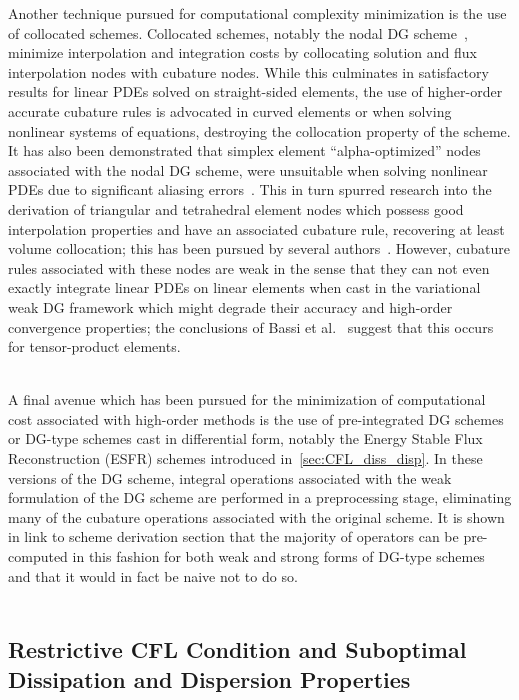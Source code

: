 \documentclass[12pt,Bold,letterpaper,TexShade]{mcgilletdclass}
\numberwithin{equation}{section}
\begin{document}
Another technique pursued for computational complexity minimization is the use of collocated schemes. Collocated schemes, notably the nodal DG scheme~\cite{hesthaven2002,hesthaven2007}, minimize interpolation and integration costs by collocating solution and flux interpolation nodes with cubature nodes. While this culminates in satisfactory results for linear PDEs solved on straight-sided elements, the use of higher-order accurate cubature rules is advocated in curved elements or when solving nonlinear systems of equations, destroying the collocation property of the scheme. It has also been demonstrated that simplex element ``alpha-optimized'' nodes~\cite{warburton2006} associated with the nodal DG scheme, were unsuitable when solving nonlinear PDEs due to significant aliasing errors~\cite{witherden2014}. This in turn spurred research into the derivation of triangular and tetrahedral element nodes which possess good interpolation properties and have an associated cubature rule, recovering at least volume collocation; this has been pursued by several authors~\cite{witherden2014,williams2014b,shunn2012}. However, cubature rules associated with these nodes are weak in the sense that they can not even exactly integrate linear PDEs on linear elements when cast in the variational weak DG framework which might degrade their accuracy and high-order convergence properties; the conclusions of Bassi et al.~\cite{bassi2013} suggest that this occurs for tensor-product elements.
\\~

A final avenue which has been pursued for the minimization of computational cost associated with high-order methods is the use of pre-integrated DG schemes~\cite{atkins1996} or DG-type schemes cast in differential form, notably the Energy Stable Flux Reconstruction (ESFR) schemes introduced in~\autoref{sec:CFL_diss_disp}. In these versions of the DG scheme, integral operations associated with the weak formulation of the DG scheme are performed in a preprocessing stage, eliminating many of the cubature operations associated with the original scheme. It is shown in {\color{red} link to scheme derivation section} that the majority of operators can be pre-computed in this fashion for both weak and strong forms of DG-type schemes and that it would in fact be naive not to do so.
\\~

\subsection{Restrictive CFL Condition and Suboptimal Dissipation and Dispersion Properties}
\label{sec:CFL_diss_disp}
\end{document}
